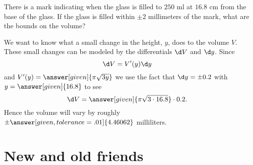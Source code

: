 \documentclass{ximera}
\begin{document}
\begin{example}
  There is a mark indicating when the glass is filled to $250$ ml at $16.8$ cm from the base of the glass. 
  If the glass is filled within
  $\pm 2$ millimeters of the mark, what are the bounds on the volume?
  \begin{explanation}
    We want to know what a small change in the height, $y$, does to the
    volume $V$.  These small changes can be modeled by the
    differentials $\d V$ and $\d y$. Since
    \[
    \d V = V'(y) \d y
    \]
    and $V'(y) = \answer[given]{\pi \sqrt{3 y}}$ we use the fact that
    $\d y = \pm 0.2$ with $y=\answer[given]{16.8}$ to see
    \[
    \d V = \answer[given]{\pi \sqrt{3 \cdot 16.8}} \cdot 0.2.
    \]
    Hence the volume will vary by roughly $\pm\answer[given,tolerance=.01]{4.46062}$
    milliliters.
  \end{explanation}
\end{example}

\section{New and old friends}
\end{document}
